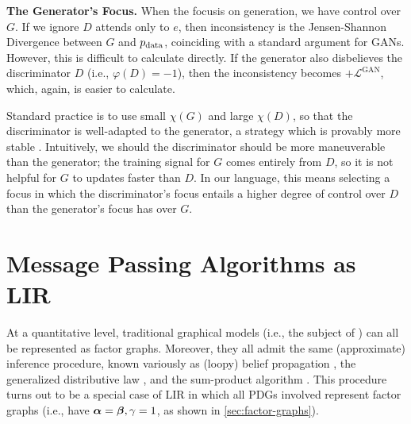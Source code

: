 \textbf{The Generator's Focus.}
When the focusis on generation, we have control over $G$.
If we ignore $D$ attends only to $e$, then inconsistency
    is the Jensen-Shannon Divergence between $G$ and $p_{\mathrm{data}}$,
    coinciding with a standard argument for GANs. 
However, this is difficult to calculate directly.
If the generator also disbelieves the discriminator $D$
    (i.e., $ \varphi(D) =-1$),
    then the inconsistency becomes $+\mathcal L^{\text{GAN}}$,
    which, again, is easier to calculate.

Standard practice is to use small $\chi(G)$ and large $\chi(D)$,
so that the discriminator is well-adapted to the generator,
a strategy which is provably more stable
    \citep{two-scale-GAN-Heusel2017}.
Intuitively, we should the discriminator should be more maneuverable than the generator; the training signal for $G$ comes entirely from $D$, so it is not helpful for $G$ to updates faster than $D$.
In our language, this means selecting a focus in which the discriminator's focus entails a higher degree of control over $D$ than the generator's focus has over $G$.

\section{Message Passing Algorithms as LIR}

At a quantitative level, traditional graphical models (i.e., the subject of \citet{KF09}) can all be represented as factor graphs.
Moreover, they all admit the same
    (approximate) inference procedure, known
    variously as (loopy) belief propagation \citep{KF09},
    the generalized distributive law \citep{aji2000gendistriblaw},
    and the sum-product algorithm \citep{kschischang2001factor}.
This procedure turns out to be 
    a special case of LIR in which all PDGs involved represent factor graphs
    (i.e., have $\boldsymbol\alpha = \boldsymbol\beta, \gamma=1$, as shown in \cref{sec:factor-graphs}).

